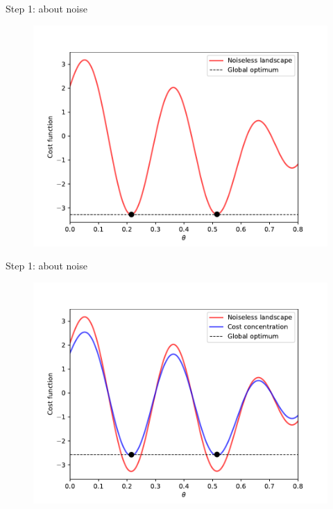 \documentclass[8pt, xcolor={svgnames}, hyperref={linkcolor=black}]{beamer}
\begin{document}
\begin{frame}{Step 1: about noise}
\begin{figure}
\includegraphics[width=1\textwidth]{figures/norm.pdf}
\end{figure}
\end{frame}

\begin{frame}{Step 1: about noise}
\begin{figure}
\includegraphics[width=1\textwidth]{figures/conc.pdf}
\end{figure}
\end{frame}
\end{document}
